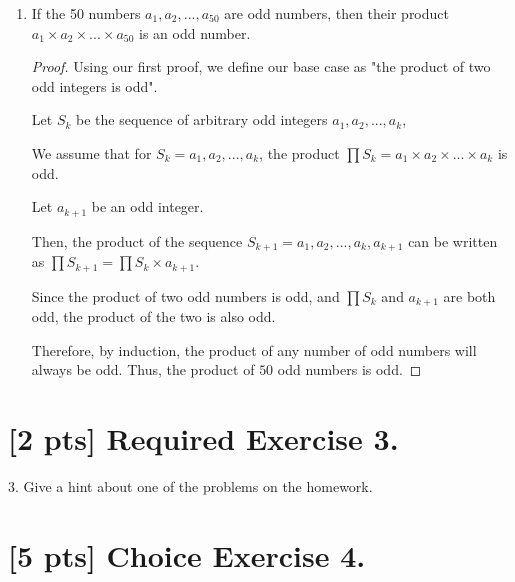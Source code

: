 \documentclass{article}
\begin{document}
\begin{enumerate}
{\begin{proof}
            Thus, \((a_1 \times a_2) \times (a_3 \times a_4)\) is odd.

            By the associative property of multiplication,
            \[a_1 \times a_2 \times ... \times a_4 = (a_1 \times a_2) \times (a_3 \times a_4), \]
            and therefore \(a_1 \times a_2 \times ... \times a_4 \) is odd.
        \end{proof}
    }

    \item {
        If the 50 numbers \(a_1, a_2, ..., a_{50} \)
        are odd numbers, then their product \(a_1 \times a_2 \times ... \times a_50\)
        is an odd number.

        \begin{proof}
            Using our first proof, we define our base case as "the product of
            two odd integers is odd".

            Let \(S_k\) be the sequence of arbitrary odd integers \(a_1, a_2, ..., a_k\), 
            
            We assume that for \(S_k = a_1, a_2, ..., a_k\), the product 
            \(\prod{S_k} = a_1 \times a_2 \times ... \times a_k\) is odd.

            Let \(a_{k+1}\) be an odd integer.

            Then, the product of the sequence \(S_{k+1} = a_1, a_2, ..., a_k, a_{k+1}\)
            can be written as \(\prod{S_{k+1}} = \prod{S_k} \times a_{k+1} \).

            Since the product of two odd numbers is odd, and \(\prod{S_k}\) and \(a_{k+1}\) 
            are both odd, the product of the two is also odd. 

            Therefore, by induction, the product of any number of odd numbers will 
            always be odd. Thus, the product of \(50\) odd numbers is odd.
        \end{proof}
    }
\end{enumerate}

\section*{[2 pts] Required Exercise 3.}

3. Give a hint about one of the problems on the homework.

\section*{[5 pts] Choice Exercise 4.}
\end{document}
